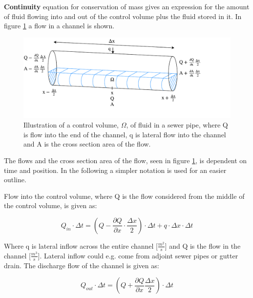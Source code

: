 \textbf{Continuity} equation for conservation of mass gives an expression for the amount of fluid flowing into and out of the control volume plus the fluid stored in it. 
In figure \ref{fig:firkant_kloak} a flow in a channel is shown. 

\begin{figure}[H]
\centering
\includegraphics[width=1.1\textwidth]{report/modeling/pictures/continuity_open_channel.pdf}
\caption{Illustration of a control volume, $\Omega$, of fluid in a sewer pipe, where Q is flow into the end of the channel, q is lateral flow into the channel and A is the cross section area of the flow.}
\label{fig:firkant_kloak}
\end{figure}

The flows and the cross section area of the flow, seen in figure \ref{fig:firkant_kloak}, is dependent on time and position. In the following a simpler notation is used for an easier outline. 

Flow into the control volume, where Q is the flow considered from the middle of the control volume, is given as:

\begin{equation}
Q_{in} \cdot \Delta t =	\left(Q - \frac{\partial Q}{\partial x}\cdot \frac{\Delta x}{2}\right) \cdot \Delta t + q \cdot \Delta x \cdot \Delta t
\label{flowin_saintbernard}
\end{equation}

Where q is lateral inflow across the entire channel [$\frac{m^2}{s}$] and Q is the flow in the channel [$\frac{m^3}{s}$]. Lateral inflow could e.g. come from adjoint sewer pipes or gutter drain.
The discharge flow of the channel is given as:

\begin{equation}
Q_{out} \cdot \Delta t =\left(Q + \frac{\partial Q}{ \partial x} \frac{\Delta x}{2} \right) \cdot \Delta t 
\label{flowout_saintbernard}
\end{equation}

